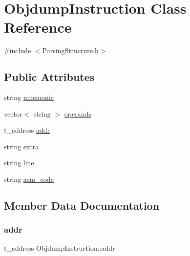 \hypertarget{classObjdumpInstruction}{}\section{Objdump\+Instruction Class Reference}
\label{classObjdumpInstruction}


{\ttfamily \#include $<$Parsing\+Structure.\+h$>$}

\subsection*{Public Attributes}
\begin{DoxyCompactItemize}
\item 
string \hyperlink{classObjdumpInstruction_a0593c29d8097e0e8ebbde4905dbe397c}{mnemonic}
\item 
vector$<$ string $>$ \hyperlink{classObjdumpInstruction_abcd33dab22101163203d32e0de8590ec}{operands}
\item 
t\+\_\+address \hyperlink{classObjdumpInstruction_ae1208e95ad7ae197e46fa51cb02bc38b}{addr}
\item 
string \hyperlink{classObjdumpInstruction_a56754e1d9bf82ebcdc4da2cb9b8819fc}{extra}
\item 
string \hyperlink{classObjdumpInstruction_a9ff2153d3ffe9494c32de1e8675d5d8f}{line}
\item 
string \hyperlink{classObjdumpInstruction_a8e2ef18c1d7e4f88967219bb98b19b98}{asm\+\_\+code}
\end{DoxyCompactItemize}


\subsection{Member Data Documentation}
\mbox{\label{classObjdumpInstruction_ae1208e95ad7ae197e46fa51cb02bc38b}} 
\subsubsection{\texorpdfstring{addr}{addr}}
{\footnotesize\ttfamily t\+\_\+address Objdump\+Instruction\+::addr}

\mbox{\label{classObjdumpInstruction_a8e2ef18c1d7e4f88967219bb98b19b98}} 
